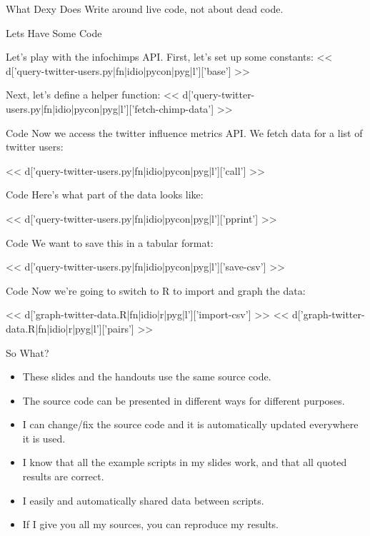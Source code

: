 \documentclass{beamer}
\begin{document}
\begin{frame}{What Dexy Does}
Write around live code, not about dead code.
\end{frame}

\begin{frame}[fragile]{Lets Have Some Code}

Let's play with the infochimps API. First, let's set up some constants:
\scriptsize
<< d['query-twitter-users.py|fn|idio|pycon|pyg|l']['base'] >>
\normalsize

\vspace{1cm}

Next, let's define a helper function:
\scriptsize
<< d['query-twitter-users.py|fn|idio|pycon|pyg|l']['fetch-chimp-data'] >>
\normalsize

\end{frame}

\begin{frame}[fragile]{Code}
Now we access the twitter influence metrics API.
We fetch data for a list of twitter users:

\scriptsize
<< d['query-twitter-users.py|fn|idio|pycon|pyg|l']['call'] >>
\normalsize
\end{frame}

\begin{frame}[fragile]{Code}
Here's what part of the data looks like:

\scriptsize
<< d['query-twitter-users.py|fn|idio|pycon|pyg|l']['pprint'] >>
\normalsize
\end{frame}

\begin{frame}[fragile]{Code}
We want to save this in a tabular format:

\scriptsize
<< d['query-twitter-users.py|fn|idio|pycon|pyg|l']['save-csv'] >>
\normalsize
\end{frame}

\begin{frame}[fragile]{Code}
Now we're going to switch to R to import and graph the data:

\scriptsize
<< d['graph-twitter-data.R|fn|idio|r|pyg|l']['import-csv'] >>
<< d['graph-twitter-data.R|fn|idio|r|pyg|l']['pairs'] >>
\normalsize
\end{frame}


\begin{frame}{So What?}
\begin{itemize}
\item{These slides and the handouts use the same source code.}
\item{The source code can be presented in different ways for different purposes.}
\item{I can change/fix the source code and it is automatically updated everywhere it is used.}
\item{I know that all the example scripts in my slides work, and that all quoted results are correct.}
\item{I easily and automatically shared data between scripts.}
\item{If I give you all my sources, you can reproduce my results.}
\end{itemize}
\end{frame}
\end{document}

